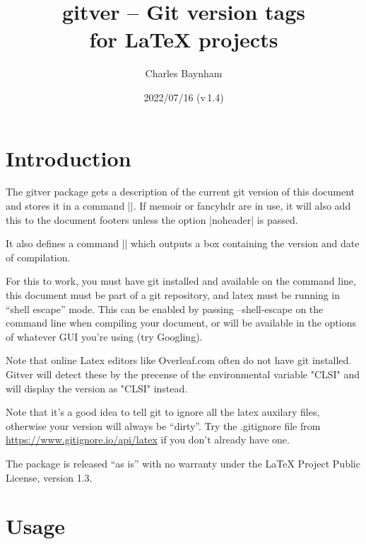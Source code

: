 \documentclass[a4paper]{ltxdoc}
\begin{document}
\title{\textsf{gitver} -- Git version tags \\ 
for \LaTeX{} projects}
\author{Charles Baynham}
\date{2022/07/16 (v\,1.4)}

\maketitle

\section{Introduction}

The \textsf{gitver} package gets a description of the current git version of this
document and stores it in a command |\gitVer|. If memoir or fancyhdr are in use, it
will also add this to the document footers unless the option |noheader| is
passed.

It also defines a command |\versionBox| which outputs a box containing the
version and date of compilation. 

For this to work, you must have git installed and available on the command
line, this document must be part of a git repository, and latex must be
running in ``shell escape'' mode. This can be enabled by passing \textsf{--shell-escape}
on the command line when compiling your document, or will be available in the
options of whatever GUI you're using (try Googling).

Note that online Latex editors like Overleaf.com often do not have git installed.
Gitver will detect these by the precense of the environmental variable "CLSI" 
and will display the version as "CLSI" instead. 

Note that it's a good idea to tell git to ignore all the latex auxilary files,
otherwise your version will always be ``dirty''. Try the \textsf{.gitignore} file from
\url{https://www.gitignore.io/api/latex} if you don't already have
one.

The package is released ``as is'' with no warranty under the LaTeX Project Public
License, version 1.3.

\section{Usage}
\end{document}
